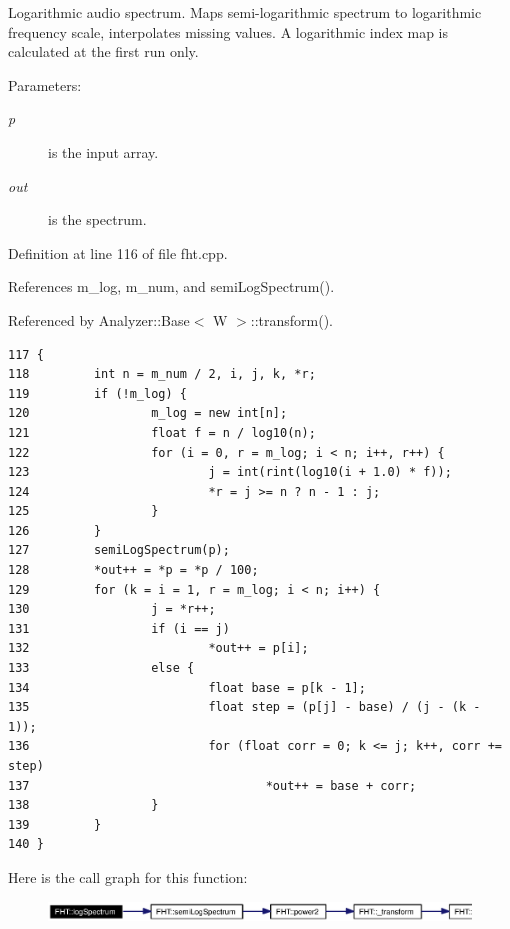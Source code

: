 Logarithmic audio spectrum. Maps semi-logarithmic spectrum to logarithmic frequency scale, interpolates missing values. A logarithmic index map is calculated at the first run only. \begin{Desc}
\item[Parameters:]
\begin{description}
\item[{\em p}]is the input array. \item[{\em out}]is the spectrum.\end{description}
\end{Desc}


Definition at line 116 of file fht.cpp.

References m\_\-log, m\_\-num, and semi\-Log\-Spectrum().

Referenced by Analyzer::Base$<$ W $>$::transform().



\footnotesize\begin{verbatim}117 {
118         int n = m_num / 2, i, j, k, *r;
119         if (!m_log) {
120                 m_log = new int[n];
121                 float f = n / log10(n);
122                 for (i = 0, r = m_log; i < n; i++, r++) {
123                         j = int(rint(log10(i + 1.0) * f));
124                         *r = j >= n ? n - 1 : j;
125                 }
126         }
127         semiLogSpectrum(p);
128         *out++ = *p = *p / 100;
129         for (k = i = 1, r = m_log; i < n; i++) {
130                 j = *r++;
131                 if (i == j)
132                         *out++ = p[i];
133                 else {
134                         float base = p[k - 1];
135                         float step = (p[j] - base) / (j - (k - 1));
136                         for (float corr = 0; k <= j; k++, corr += step)
137                                 *out++ = base + corr;
138                 }
139         }
140 }
\end{verbatim}\normalsize 


Here is the call graph for this function:\begin{figure}[H]
\begin{center}
\leavevmode
\includegraphics[width=327pt]{classFHT_FHTa9_cgraph}
\end{center}
\end{figure}
